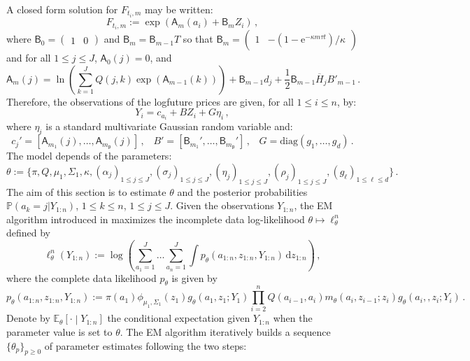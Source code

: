 \documentclass[nolayout]{article}
\theoremstyle{plain}
\theoremstyle{definition}
\newcommand{\1}{\mathbbm{1}}
\def\rmd{\mathrm{d}}
\def\rme{\mathrm{e}}
\def\dimy{\mathsf{p}}
\def\barH{\overline{H}}
\def\eqsp{\,}
\newcommand{\eqdef}{\ensuremath{:=}}
\begin{document}
A closed form solution for $F_{t_i,m}$  may be written:
\[
F_{t_i,m} \eqdef \exp\left( \mathsf{A}_{m}(a_{i}) + \mathsf{B}_{m} Z_{i}\right)\eqsp,
\]
where $\mathsf{B}_0	= \begin{pmatrix}1 & 0 \end{pmatrix}$ and  $\mathsf{B}_m    = \mathsf{B}_{m-1} T$ so that  $ \mathsf{B}_m= \begin{pmatrix} 1 & -\left(1-\rme^{-\kappa m \tau t}\right)/\kappa \end{pmatrix}$ and
for all $1\le j\le J$, $\mathsf{A}_0(j) = 0$,  and
\begin{equation*}
\mathsf{A}_m(j) = \ln \left(\sum^J_{k=1} Q(j,k) \exp(\mathsf{A}_{m-1}(k)) \right) + \mathsf{B}_{m-1} d_j + \frac{1}{2} \mathsf{B}_{m-1} \barH_j B'_{m-1}\eqsp.
\end{equation*}
Therefore, the observations of the  logfuture prices are given, for all $1\le i\le n$, by:
\[
Y_i = c_{a_i} + B Z_i + G \eta_i\eqsp,
\]
where $\eta_i$ is a standard multivariate Gaussian random variable and:
\[
c_{j}' = [ \mathsf{A}_{m_1}(j), \dots, \mathsf{A}_{m_{\dimy}}(j) ]\eqsp,
\;\;\;
B' = [\mathsf{B}_{m_1}',  \dots, \mathsf{B}_{m_{\dimy}}']\eqsp, \;\;\;
G = \mathrm{diag}(g_1, \dots , g_{d} )\eqsp.
\]
The model depends of the parameters:
\[
\theta \eqdef \{\pi, Q, \mu_1, \Sigma_1, \kappa, (\alpha_j)_{1\leq j\leq J}, (\sigma_j)_{1\leq j\leq J}, (\eta_j)_{1\leq j\leq J}, (\rho_j)_{1\leq j\leq J}, (g_{\ell})_{1\leq \ell\leq d} \}\eqsp .
\]
The aim of this section is to estimate $\theta$ and the posterior probabilities $\mathbb{P}(a_k=j|Y_{1:n})$, $1\le k \le n$, $1\le j \le J$. Given the observations $Y_{1:n}$, the EM algorithm introduced in \cite{dempster:laird:rubin:1977} maximizes the incomplete data log-likelihood $\theta\mapsto \ell_{\theta}^{n}$ defined by
\begin{equation*}
\ell_{\theta}^{n}(Y_{1:n}) \eqdef \log\left(\sum_{a_1=1}^J\ldots\sum_{a_n=1}^J\int p_{\theta}(a_{1:n},z_{1:n},Y_{1:n})\,\rmd z_{1:n}\right)\eqsp,
\end{equation*}
where the complete data likelihood $p_{\theta}$ is given by
\begin{equation*}
p_{\theta}(a_{1:n},z_{1:n},Y_{1:n}) \eqdef \pi(a_1)\phi_{\mu_1,\Sigma_1}(z_1)g_{\theta}(a_1,z_1;Y_1)\prod^{n}_{i=2}Q(a_{i-1},a_i)m_{\theta}\left(a_{i},z_{i-1};z_i\right)g_{\theta}(a_i,,z_i;Y_i)\eqsp.
\end{equation*}
Denote by $\mathbb{E}_{\theta}\left[\cdot\middle|Y_{1:n}\right]$  the conditional expectation given $Y_{1:n}$ when the parameter value is set to $\theta$. The EM algorithm iteratively builds a sequence $\{\theta_{p}\}_{p\ge 0}$ of parameter estimates following the two steps:
\end{document}
